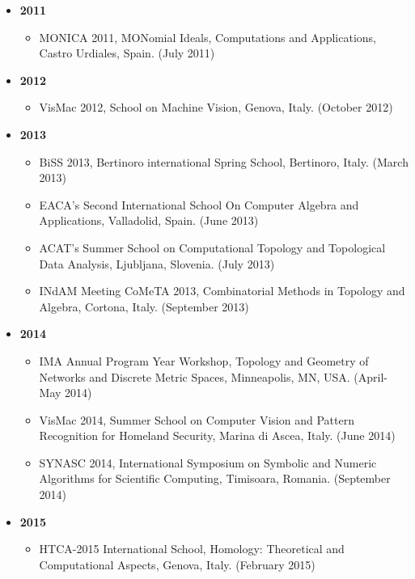 \documentclass[11pt]{article}
\begin{document}
\begin{itemize}
\item[ ]{\bf 2011}
\begin{itemize}
\item{MONICA 2011, MONomial Ideals, Computations and Applications, Castro Urdiales, Spain. (July 2011)}
\end{itemize}
\vspace*{0.2ex}
\item[ ]{\bf 2012}
\begin{itemize}
\item{VisMac 2012, School on Machine Vision, Genova, Italy. (October 2012)}
\end{itemize}
\vspace*{0.2ex}
\item[ ]{\bf 2013}
\begin{itemize}
\item{BiSS 2013, Bertinoro international Spring School, Bertinoro, Italy. (March 2013)}
\item{EACA's Second International School On Computer Algebra and Applications, Valladolid, Spain. (June 2013)}
\item{ACAT's Summer School on Computational Topology and Topological Data Analysis, Ljubljana, Slovenia. (July 2013)}
\item{INdAM Meeting CoMeTA 2013, Combinatorial Methods in Topology and Algebra, Cortona, Italy. (September 2013)}
\end{itemize}
\vspace*{0.2ex}
\item[ ]{\bf 2014}
\begin{itemize}
\item{IMA Annual Program Year Workshop, Topology and Geometry of Networks and Discrete Metric Spaces, Minneapolis, MN, USA. (April-May 2014)}
\item{VisMac 2014, Summer School on Computer Vision and Pattern Recognition for Homeland Security, Marina di Ascea, Italy. (June 2014)}
\item{SYNASC 2014, International Symposium on Symbolic and Numeric Algorithms for Scientific Computing, Timisoara, Romania. (September 2014)}
\end{itemize}
\vspace*{0.2ex}
\item[ ]{\bf 2015}
\begin{itemize}
\item{HTCA-2015 International School, Homology: Theoretical and Computational Aspects, Genova, Italy. (February 2015)}

\end{itemize}
\end{itemize}
\end{document}
